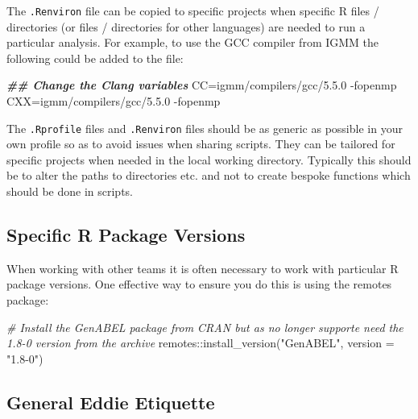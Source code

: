 \documentclass[
]{book}
\newenvironment{Shaded}{\begin{snugshade}}{\end{snugshade}}
\newcommand{\AttributeTok}[1]{\textcolor[rgb]{0.77,0.63,0.00}{#1}}
\newcommand{\CommentTok}[1]{\textcolor[rgb]{0.56,0.35,0.01}{\textit{#1}}}
\newcommand{\DecValTok}[1]{\textcolor[rgb]{0.00,0.00,0.81}{#1}}
\newcommand{\DocumentationTok}[1]{\textcolor[rgb]{0.56,0.35,0.01}{\textbf{\textit{#1}}}}
\newcommand{\FloatTok}[1]{\textcolor[rgb]{0.00,0.00,0.81}{#1}}
\newcommand{\FunctionTok}[1]{\textcolor[rgb]{0.00,0.00,0.00}{#1}}
\newcommand{\NormalTok}[1]{#1}
\newcommand{\OtherTok}[1]{\textcolor[rgb]{0.56,0.35,0.01}{#1}}
\newcommand{\SpecialCharTok}[1]{\textcolor[rgb]{0.00,0.00,0.00}{#1}}
\newcommand{\StringTok}[1]{\textcolor[rgb]{0.31,0.60,0.02}{#1}}
\begin{document}
The \texttt{.Renviron} file can be copied to specific projects when specific R files / directories (or files / directories for other languages) are needed to run a particular analysis. For example, to use the GCC compiler from IGMM the following could be added to the file:

\begin{Shaded}
\begin{Highlighting}[]
\DocumentationTok{\#\# Change the Clang variables}
\NormalTok{CC}\OtherTok{=}\NormalTok{igmm}\SpecialCharTok{/}\NormalTok{compilers}\SpecialCharTok{/}\NormalTok{gcc}\SpecialCharTok{/}\DecValTok{5}\NormalTok{.}\FloatTok{5.0} \SpecialCharTok{{-}}\NormalTok{fopenmp}
\NormalTok{CXX}\OtherTok{=}\NormalTok{igmm}\SpecialCharTok{/}\NormalTok{compilers}\SpecialCharTok{/}\NormalTok{gcc}\SpecialCharTok{/}\DecValTok{5}\NormalTok{.}\FloatTok{5.0} \SpecialCharTok{{-}}\NormalTok{fopenmp}
\end{Highlighting}
\end{Shaded}

The \texttt{.Rprofile} files and \texttt{.Renviron} files should be as generic as possible in your own profile so as to avoid issues when sharing scripts. They can be tailored for specific projects when needed in the local working directory. Typically this should be to alter the paths to directories etc. and not to create bespoke functions which should be done in scripts.

\hypertarget{specific-r-package-versions}{%
\subsection{Specific R Package Versions}\label{specific-r-package-versions}}

When working with other teams it is often necessary to work with particular R package versions. One effective way to ensure you do this is using the remotes package:

\begin{Shaded}
\begin{Highlighting}[]
\CommentTok{\# Install the GenABEL package from CRAN but as no longer supporte need the 1.8{-}0 version from the archive}
\NormalTok{remotes}\SpecialCharTok{::}\FunctionTok{install\_version}\NormalTok{(}\StringTok{"GenABEL"}\NormalTok{, }\AttributeTok{version =} \StringTok{"1.8{-}0"}\NormalTok{)}
\end{Highlighting}
\end{Shaded}

\hypertarget{general-eddie-etiquette}{%
\subsection{General Eddie Etiquette}\label{general-eddie-etiquette}}
\end{document}
